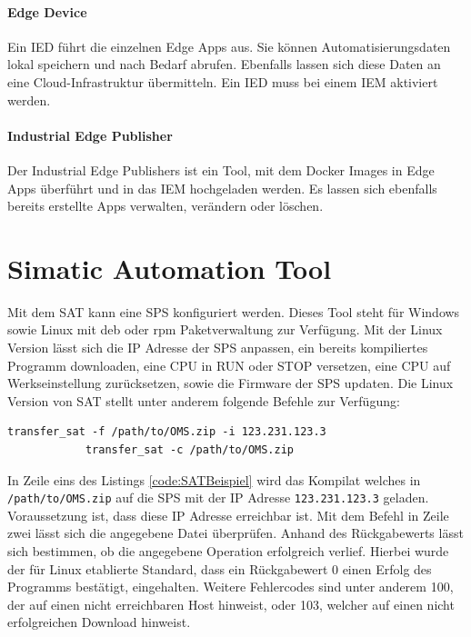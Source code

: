 		\paragraph{Edge Device}
			Ein \gls{IED} führt die einzelnen Edge Apps aus. Sie können Automatisierungsdaten lokal speichern und nach Bedarf abrufen. 
			Ebenfalls lassen sich diese Daten an eine Cloud-Infrastruktur übermitteln. Ein \gls{IED} muss bei einem \gls{IEM} aktiviert werden.
			\cite{siemensIEM_gettingStarted}
			
		\paragraph{Industrial Edge Publisher}
			Der Industrial Edge Publishers ist ein Tool, mit dem Docker Images in Edge Apps überführt und in das \gls{IEM} hochgeladen werden.
			Es lassen sich ebenfalls bereits erstellte Apps verwalten, verändern oder löschen.
			\cite{siemensIE_App}

	
	\section{Simatic Automation Tool}
	\label{Grundlagen:SAT}
		Mit dem \gls{SAT} kann eine SPS konfiguriert werden.
		Dieses Tool steht für Windows sowie Linux mit deb oder rpm Paketverwaltung zur Verfügung. \cite{siemensSAT}
		Mit der Linux Version lässt sich die IP Adresse der SPS anpassen, ein bereits kompiliertes Programm downloaden, eine CPU in RUN oder STOP versetzen, eine CPU auf Werkseinstellung zurücksetzen, sowie die Firmware der SPS updaten\cite{siemensSAT_Online}. 
		Die Linux Version von \gls{SAT} stellt unter anderem folgende Befehle zur Verfügung:
		\begin{lstlisting}[caption={Beispielbefehle für SAT}, label={code:SATBeispiel}]
			transfer_sat -f /path/to/OMS.zip -i 123.231.123.3
			transfer_sat -c /path/to/OMS.zip
		\end{lstlisting}
		In Zeile eins des Listings \ref{code:SATBeispiel} wird das Kompilat welches in \lstinline|/path/to/OMS.zip| auf die SPS mit der IP Adresse \lstinline|123.231.123.3| geladen. 
		Voraussetzung ist, dass diese IP Adresse erreichbar ist.
		Mit dem Befehl in Zeile zwei lässt sich die angegebene Datei überprüfen.
		Anhand des Rückgabewerts lässt sich bestimmen, ob die angegebene Operation erfolgreich verlief.
		Hierbei wurde der für Linux etablierte Standard, dass ein Rückgabewert 0 einen Erfolg des Programms bestätigt, eingehalten.
		Weitere Fehlercodes sind unter anderem 100, der auf einen nicht erreichbaren Host hinweist, oder 103, welcher auf einen nicht erfolgreichen Download hinweist. \cite{siemensSAT}
					

